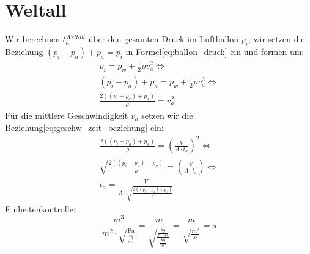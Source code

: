\documentclass{article}
\begin{document}
    \section{Weltall}
        Wir berechnen \(t_a^{Weltall}\) über den gesamten Druck im Luftballon \( p_i \), wir setzen die Beziehung \((p_i - p_a) + p_a = p_i \) in Formel\ref{eq:ballon_druck} ein und formen um:
        \begin{equation}
            \begin{gathered}
                p_i = p_w + \frac{1}{2} \rho v_a^2 \Leftrightarrow \\
                (p_i - p_a) + p_a = p_w + \frac{1}{2} \rho v_a^2 \Leftrightarrow \\
                \frac{2((p_i - p_a) + p_a)}{ \rho } = v_a^2
            \end{gathered}
        \end{equation}
        Für die mittlere Geschwindigkeit \(v_a\) setzen wir die Beziehung\ref{eq:geschw_zeit_beziehung} ein:
        \begin{equation}
            \begin{gathered}
                \frac{ 2((p_i - p_a) + p_a)}{ \rho } = { \left( \frac{V}{A \cdot t_a} \right) }^2 \Leftrightarrow \\
                \sqrt{ \frac{ 2((p_i - p_a) + p_a)}{ \rho } } = \left( \frac{V}{A \cdot t_a} \right) \Leftrightarrow \\
                t_a = \frac{V}{ A \cdot \sqrt{ \frac{ 2((p_i - p_a) + p_a)}{ \rho }} }
            \end{gathered}
        \end{equation}
        Einheitenkontrolle:
        \begin{equation}
            \frac{\si{m^3}}{\si{m^2} \cdot \sqrt{\frac{ \si{\pascal} }{ \frac{\si{kg}}{\si{m^3}} } }} =
            \frac{\si{m}}{ \sqrt{\frac{\frac{\si{kg}}{\si{m}\cdot\si{s^2}}}{\frac{\si{kg}}{\si{m^3}}}} } =
            \frac{\si{m}}{\sqrt{\frac{\si{m^2}}{\si{s^2}}}} = \si{s}
        \end{equation}
\end{document}
